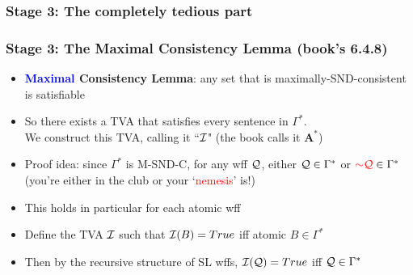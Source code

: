 \subsubsection{Stage 3: The completely tedious part}

\begin{frame}
\frametitle{Stage 3: The Maximal Consistency Lemma (book's 6.4.8)}

\begin{itemize}[<+->]

\item \textbf{\textcolor{blue}{Maximal} \alert{Consistency Lemma}}: any set that is maximally-SND-consistent is satisfiable

\item So there exists a TVA that satisfies every sentence in $\Gamma^{\ast}$. \\ We construct this TVA, calling it ``$\mathcal{I}$" (the book calls it $\textbf{A}^{\ast}$)

\item Proof idea: since $\Gamma^{\ast}$ is M-SND-C, for any wff $\mathcal{Q}$, either $\mathcal{Q} \in \Gamma^{\ast}$ or $\textcolor{red}{\enot \metav{Q}} \in \Gamma^{\ast}$ (you're either in the club or your `\textcolor{red}{nemesis}' is!)

\item[] This holds in particular for each atomic wff

\item Define the TVA $\mathcal{I}$ such that $\mathcal{I}(B) = True$ iff atomic $B \in \Gamma^{\ast}$

\item Then by the recursive structure of SL wffs, $\mathcal{I}(\mathcal{Q}) = True$ iff $\mathcal{Q} \in \Gamma^{\ast}$

\end{itemize}
\end{frame}

